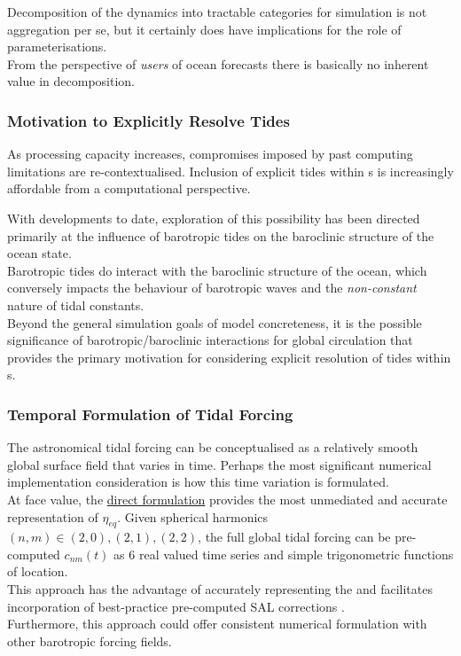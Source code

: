 Decomposition of the dynamics into tractable categories for simulation is not aggregation per se, but it certainly does have implications for the role of parameterisations.  \\

From the perspective of \emph{users} of ocean forecasts there is basically no inherent value in decomposition.   
 
\subsubsection{Motivation to Explicitly Resolve Tides}

As processing capacity increases, compromises imposed by past computing limitations are re-contextualised.   Inclusion of explicit tides within \OGCM{}s is increasingly affordable from a computational perspective.

With developments to date, exploration of this possibility has been directed primarily at the influence of barotropic tides on the baroclinic structure of the ocean state.   \\


Barotropic tides do interact with the baroclinic structure of the ocean, which conversely impacts the behaviour of barotropic waves and the \emph{non-constant} \citep{Ray:2010jm} nature of tidal constants.\\

Beyond the general simulation goals of model concreteness, it is the possible significance of barotropic/baroclinic interactions for global circulation that provides the primary motivation for considering explicit resolution of tides within \OGCM{}s.   



\subsubsection{Temporal Formulation of Tidal Forcing}
\label{S:numerical_impl}

The astronomical tidal forcing can be conceptualised as a relatively smooth global surface field that varies in time. 
Perhaps the most significant numerical implementation consideration is how this time variation is formulated.\\


At face value, the \underline{direct formulation} provides the most unmediated and accurate representation of $\eta_{eq}$. Given spherical harmonics $(n,m) \in (2,0) , (2,1) , (2,2)$, the full global tidal forcing can be pre-computed $c_{nm}(t)$ as 6 real valued time series and simple trigonometric functions of location.\\
This approach has the advantage of accurately representing the \ATGP{} and facilitates incorporation of best-practice pre-computed SAL corrections \citep{Egbert:2002ug}. \\
Furthermore, this approach could offer consistent numerical formulation with other barotropic forcing fields.\\


